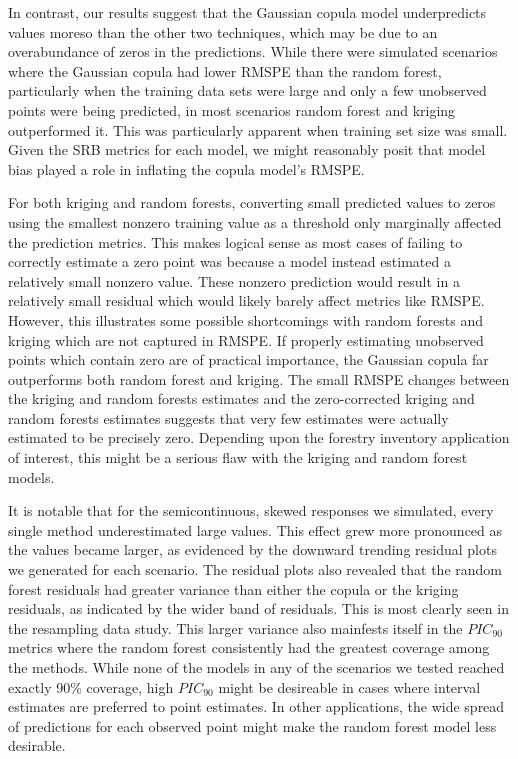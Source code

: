 \documentclass{article}
\begin{document}
In contrast, our results suggest that the Gaussian copula model underpredicts values moreso than the other two techniques, which may be due to an overabundance of zeros in the predictions.
While there were simulated scenarios where the Gaussian copula had lower RMSPE than the random forest, particularly when the training data sets were large and only a few unobserved points were being predicted, in most scenarios random forest and kriging outperformed it.
This was particularly apparent when training set size was small.
Given the SRB metrics for each model, we might reasonably posit that model bias played a role in inflating the copula model's RMSPE.

For both kriging and random forests, converting small predicted values to zeros using the smallest nonzero training value as a threshold only marginally affected the prediction metrics.
This makes logical sense as most cases of failing to correctly estimate a zero point was because a model instead estimated a relatively small nonzero value.
These nonzero prediction would result in a relatively small residual which would likely barely affect metrics like RMSPE.
However, this illustrates some possible shortcomings with random forests and kriging which are not captured in RMSPE.
If properly estimating unobserved points which contain zero are of practical importance, the Gaussian copula far outperforms both random forest and kriging.
The small RMSPE changes between the kriging and random forests estimates and the zero-corrected kriging and random forests estimates suggests that very few estimates were actually estimated to be precisely zero.
Depending upon the forestry inventory application of interest, this might be a serious flaw with the kriging and random forest models.

It is notable that for the semicontinuous, skewed responses we simulated, every single method underestimated large values.
This effect grew more pronounced as the values became larger, as evidenced by the downward trending residual plots we generated for each scenario.
The residual plots also revealed that the random forest residuals had greater variance than either the copula or the kriging residuals, as indicated by the wider band of residuals.
This is most clearly seen in the resampling data study.
This larger variance also mainfests itself in the $PIC_{90}$ metrics where the random forest consistently had the greatest coverage among the methods.
While none of the models in any of the scenarios we tested reached exactly 90\% coverage, high $PIC_{90}$ might be desireable in cases where interval estimates are preferred to point estimates.
In other applications, the wide spread of predictions for each observed point might make the random forest model less desirable.
\end{document}
